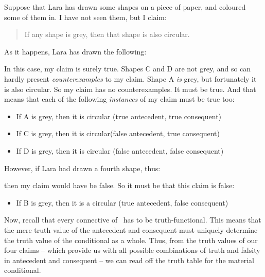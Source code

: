 Suppose that Lara has drawn some shapes on a piece of paper, and coloured some of them in. I have not seen them, but I claim:
	\begin{quote}
		If any shape is grey, then that shape is also circular.
	\end{quote}
As it happens, Lara has drawn the following:
\begin{center}
\end{center}
In this case, my claim is surely true.  Shapes C and D are not grey, and so can hardly present \emph{counterexamples} to my claim. Shape A \emph{is} grey, but fortunately it is also circular. So my claim has no counterexamples. It must be true. And that means that each of the following \emph{instances} of my claim must be true too:
	\begin{itemize}
		\item If A is grey, then it is circular \hfill (true antecedent, true consequent)
		\item If C is grey, then it is circular\hfill (false antecedent, true consequent)
		\item If D is grey, then it is circular \hfill (false antecedent, false consequent)
	\end{itemize}
However, if Lara had drawn a fourth shape, thus:
\begin{center}
\end{center}
then my claim would have be false. So it must be that this claim is false:
	\begin{itemize}
		\item If B is grey, then it is a circular \hfill (true antecedent, false consequent)
	\end{itemize}
Now, recall that every connective of \TFL\ has to be truth-functional. This means that the mere truth value of the antecedent and consequent must uniquely determine the truth value of the conditional as a whole. Thus, from the truth values of our four claims – which provide us with all possible combinations of truth and falsity in antecedent and consequent – we can read off the truth table for the material conditional.

